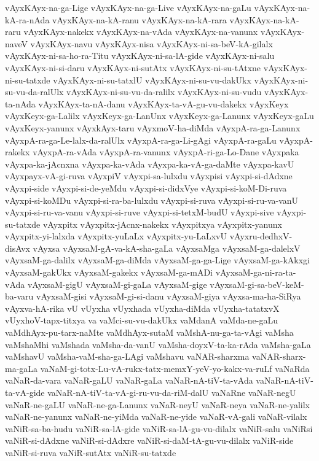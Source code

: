{vAyxKAyx-na-ga-Lige
vAyxKAyx-na-ga-Live
vAyxKAyx-na-gaLu
vAyxKAyx-na-kA-ra-nAda
vAyxKAyx-na-kA-ranu
vAyxKAyx-na-kA-rara
vAyxKAyx-na-kA-raru
vAyxKAyx-nakekx
vAyxKAyx-na-vAda
vAyxKAyx-na-vanunx
vAyxKAyx-naveV
vAyxKAyx-navu
vAyxKAyx-nisa
vAyxKAyx-ni-sa-beV-kA-gilalx
vAyxKAyx-ni-sa-ho-ra-Titu
vAyxKAyx-ni-sa-lA-gide
vAyxKAyx-ni-salu
vAyxKAyx-ni-si-daru
vAyxKAyx-ni-sutAtx
vAyxKAyx-ni-su-tAtxne
vAyxKAyx-ni-su-tatxde
vAyxKAyx-ni-su-tatxlU
vAyxKAyx-ni-su-vu-dakUkx
vAyxKAyx-ni-su-vu-da-ralUlx
vAyxKAyx-ni-su-vu-da-ralilx
vAyxKAyx-ni-su-vudu
vAyxKAyx-ta-nAda
vAyxKAyx-ta-nA-danu
vAyxKAyx-ta-vA-gu-vu-dakekx
vAyxKeyx
vAyxKeyx-ga-Lalilx
vAyxKeyx-ga-LanUnx
vAyxKeyx-ga-Lanunx
vAyxKeyx-gaLu
vAyxKeyx-yanunx
vAyxkAyx-taru
vAyxmoV-ha-diMda
vAyxpA-ra-ga-Lanunx
vAyxpA-ra-ga-Le-lalx-da-ralUlx
vAyxpA-ra-ga-Li-gAgi
vAyxpA-ra-gaLu
vAyxpA-rakekx
vAyxpA-ra-vAda
vAyxpA-ra-vanunx
vAyxpA-ri-ga-Lo-Dane
vAyxpaka
vAyxpa-ka-jAcnxna
vAyxpa-ka-vAda
vAyxpa-ka-vA-ga-daMte
vAyxpa-kavU
vAyxpayx-vA-gi-ruva
vAyxpiV
vAyxpi-sa-lulxdu
vAyxpisi
vAyxpi-si-dAdxne
vAyxpi-side
vAyxpi-si-de-yeMdu
vAyxpi-si-didxVye
vAyxpi-si-koM-Di-ruva
vAyxpi-si-koMDu
vAyxpi-si-ra-ba-lulxdu
vAyxpi-si-ruva
vAyxpi-si-ru-va-vanU
vAyxpi-si-ru-va-vanu
vAyxpi-si-ruve
vAyxpi-si-tetxM-budU
vAyxpi-sive
vAyxpi-su-tatxde
vAyxpitx
vAyxpitx-jAcnx-nakekx
vAyxpitxya
vAyxpitx-yanunx
vAyxpitx-yi-lalxda
vAyxpitx-yuLaLx
vAyxpitx-yu-LaLxvU
vAyxru-dedhxV-disAvx
vAyxsa
vAyxsaM-gA-va-kA-sha-gaLa
vAyxsaMga
vAyxsaM-ga-dalelxV
vAyxsaM-ga-dalilx
vAyxsaM-ga-diMda
vAyxsaM-ga-ga-Lige
vAyxsaM-ga-kAkxgi
vAyxsaM-gakUkx
vAyxsaM-gakekx
vAyxsaM-ga-mADi
vAyxsaM-ga-ni-ra-ta-vAda
vAyxsaM-gigU
vAyxsaM-gi-gaLa
vAyxsaM-gige
vAyxsaM-gi-sa-beV-keM-ba-varu
vAyxsaM-gisi
vAyxsaM-gi-si-danu
vAyxsaM-giya
vAyxsa-ma-ha-SiRya
vAyxva-hA-rika
vU
vUyxha
vUyxhada
vUyxha-diMda
vUyxha-tatatxvX
vUyxhoV-tapx-titxya
va
vaMci-su-vu-dakUkx
vaMdanA
vaMda-ne-gaLu
vaMdhAyx-pu-tarx-naMte
vaMdhAyx-sutaM
vaMshA-nu-ga-ta-vAgi
vaMsha
vaMshaMhi
vaMshada
vaMsha-da-vanU
vaMsha-doyxV-ta-ka-rAda
vaMsha-gaLa
vaMshavU
vaMsha-vaM-sha-ga-LAgi
vaMshavu
vaNAR-sharxma
vaNAR-sharx-ma-gaLa
vaNaM-gi-totx-Lu-vA-rukx-tatx-memxY-yeV-yo-kakx-va-ruLf
vaNaRda
vaNaR-da-vara
vaNaR-gaLU
vaNaR-gaLa
vaNaR-nA-tiV-ta-vAda
vaNaR-nA-tiV-ta-vA-gide
vaNaR-nA-tiV-ta-vA-gi-ru-vu-da-riM-dalU
vaNaRne
vaNaR-negU
vaNaR-ne-gaLU
vaNaR-ne-ga-Lanunx
vaNaR-neyU
vaNaR-neya
vaNaR-ne-yalilx
vaNaR-ne-yanunx
vaNaR-ne-yiMda
vaNaR-ne-yide
vaNaR-vA-gali
vaNaR-vilalx
vaNiR-sa-ba-hudu
vaNiR-sa-lA-gide
vaNiR-sa-lA-gu-vu-dilalx
vaNiR-salu
vaNiRsi
vaNiR-si-dAdxne
vaNiR-si-dAdxre
vaNiR-si-daM-tA-gu-vu-dilalx
vaNiR-side
vaNiR-si-ruva
vaNiR-sutAtx
vaNiR-su-tatxde
}
